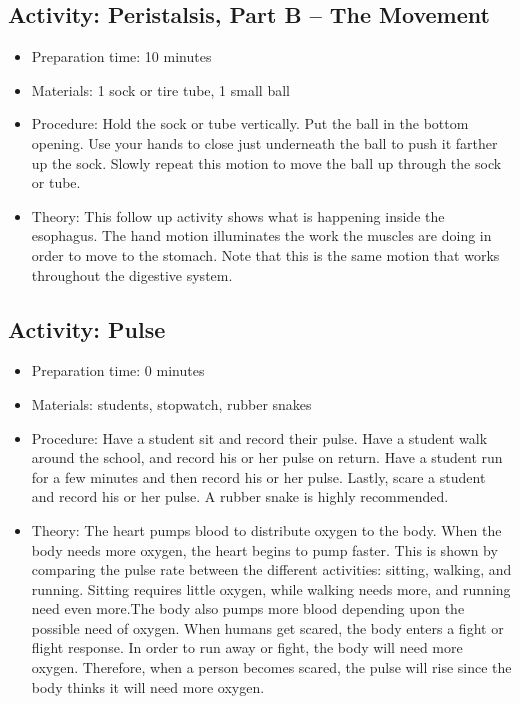 \subsection{Activity: Peristalsis, Part B – The Movement}
\begin{itemize}
\item{Preparation time: 10 minutes}
\item{Materials: 1 sock or tire tube, 1 small ball}
\item{Procedure: Hold the sock or tube vertically. Put the ball in the bottom opening. Use your hands to close just underneath the ball to push it farther up the sock. Slowly repeat this motion to move the ball up through the sock or tube.}
\item{Theory: This follow up activity shows what is happening inside the esophagus. The hand motion illuminates the work the muscles are doing in order to move to the stomach. Note that this is the same motion that works throughout the digestive system.}
\end{itemize}

\subsection{Activity: Pulse}
\begin{itemize}
\item{Preparation time: 0 minutes}
\item{Materials: students, stopwatch, rubber snakes}
\item{Procedure: Have a student sit and record their pulse. Have a student walk around the school, and record his or her pulse on return. Have a student run for a few minutes and then record his or her pulse. Lastly, scare a student and record his or her pulse. A rubber snake is highly recommended.}
\item{Theory: The heart pumps blood to distribute oxygen to the body. When the body needs more oxygen, the heart begins to pump faster. This is shown by comparing the pulse rate between the different activities: sitting, walking, and running. Sitting requires little oxygen, while walking needs more, and running need even more.The body also pumps more blood depending upon the possible need of oxygen. When humans get scared, the body enters a fight or flight response. In order to run away or fight, the body will need more oxygen. Therefore, when a person becomes scared, the pulse will rise since the body thinks it will need more oxygen.}
\end{itemize}


